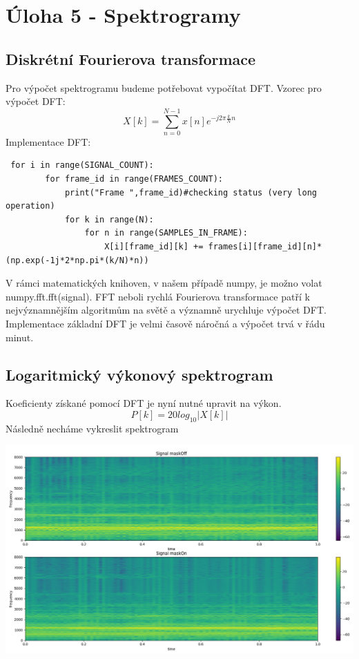 \documentclass[12pt,czech]{article}
\begin{document}
\section{Úloha 5 - Spektrogramy}
\subsection{Diskrétní Fourierova transformace}
Pro výpočet spektrogramu budeme potřebovat vypočítat DFT.\newline 
Vzorec pro výpočet DFT:
\[X[k] = \sum_{n = 0}^{N - 1} x[n] e^{-j2\pi\frac{k}{N}n}\]
Implementace DFT:
\begin{lstlisting}
 for i in range(SIGNAL_COUNT):
        for frame_id in range(FRAMES_COUNT):
            print("Frame ",frame_id)#checking status (very long operation)
            for k in range(N):
                for n in range(SAMPLES_IN_FRAME):
                    X[i][frame_id][k] += frames[i][frame_id][n]*(np.exp(-1j*2*np.pi*(k/N)*n))
\end{lstlisting}

V rámci matematických knihoven, v našem případě numpy, je možno volat numpy.fft.fft(signal). FFT neboli rychlá Fourierova transformace patří k nejvýznamnějším algoritmům na světě a významně urychluje výpočet DFT. Implementace základní DFT je velmi časově náročná a výpočet trvá v řádu minut.

\subsection{Logaritmický výkonový spektrogram}
    Koeficienty získané pomocí DFT je nyní nutné upravit na výkon.
    \[P[k] = 20log_{10}|X[k]|\]
    Následně necháme vykreslit spektrogram
    \begin{center}
        \hfill\includegraphics[scale=0.48]{images/spectrums.png}\hspace*{\fill}
    \end{center}
\clearpage
\end{document}
